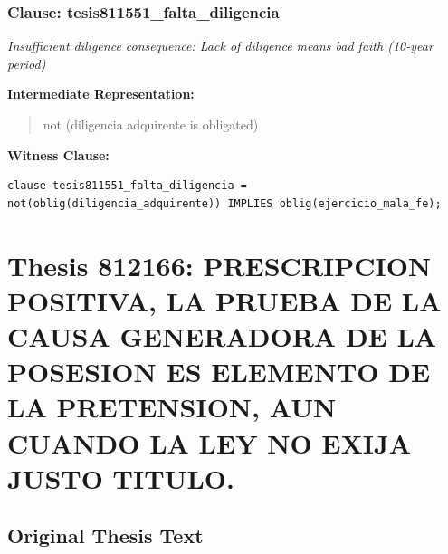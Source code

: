 \documentclass[11pt,a4paper]{article}
\begin{document}
\subsubsection{Clause: tesis811551\_falta\_diligencia}

\textit{Insufficient diligence consequence: Lack of diligence means bad faith (10-year period)}

\textbf{Intermediate Representation:}

\begin{quote}
not (diligencia adquirente is obligated)
\end{quote}

\textbf{Witness Clause:}

\begin{lstlisting}[style=witnessstyle, language=Witness]
clause tesis811551_falta_diligencia = not(oblig(diligencia_adquirente)) IMPLIES oblig(ejercicio_mala_fe);
\end{lstlisting}

\newpage

\section{Thesis 812166: PRESCRIPCION POSITIVA, LA PRUEBA DE LA CAUSA GENERADORA DE LA POSESION ES ELEMENTO DE LA PRETENSION, AUN CUANDO LA LEY NO EXIJA JUSTO TITULO.}
\label{thesis:812166}

\subsection{Original Thesis Text}
\end{document}
